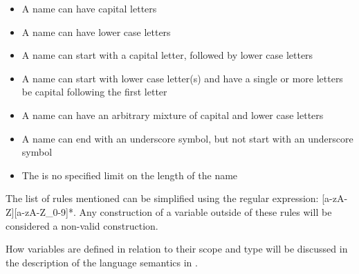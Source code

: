 \begin{itemize}
    \item A name can have capital letters
    \item A name can have lower case letters
    \item A name can start with a capital letter, followed by lower case letters
    \item A name can start with lower case letter(s) and have a single or more letters be capital following the first letter
    \item A name can have an arbitrary mixture of capital and lower case letters
    \item A name can end with an underscore symbol, but not start with an underscore symbol
    \item The is no specified limit on the length of the name
\end{itemize}

The list of rules mentioned can be simplified using the regular expression: [a-zA-Z][a-zA-Z\_0-9]*. Any construction of a variable outside of these rules will be considered
a non-valid construction.

How variables are defined in relation to their scope and type will be discussed in the description of the language semantics in .